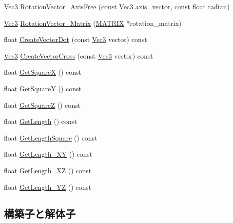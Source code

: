 \begin{DoxyCompactItemize}
\item 
\mbox{\hyperlink{_vector3_d_8h_ab16f59e4393f29a01ec8b9bbbabbe65d}{Vec3}} \mbox{\hyperlink{class_vector3_d_aadbe9f3e0ee3298c59cf123b592140bd}{Rotation\+Vector\+\_\+\+Axis\+Free}} (const \mbox{\hyperlink{_vector3_d_8h_ab16f59e4393f29a01ec8b9bbbabbe65d}{Vec3}} axis\+\_\+vector, const float radian)
\item 
\mbox{\hyperlink{_vector3_d_8h_ab16f59e4393f29a01ec8b9bbbabbe65d}{Vec3}} \mbox{\hyperlink{class_vector3_d_aa368719da4c1ac4e8a727edbd09ec390}{Rotation\+Vector\+\_\+\+Matrix}} (\mbox{\hyperlink{_vector3_d_8h_a032295cd9fb1b711757c90667278e744}{M\+A\+T\+R\+IX}} $\ast$rotation\+\_\+matrix)
\item 
float \mbox{\hyperlink{class_vector3_d_aed4c9936346cfbcb7238bd64ae1601d3}{Create\+Vector\+Dot}} (const \mbox{\hyperlink{_vector3_d_8h_ab16f59e4393f29a01ec8b9bbbabbe65d}{Vec3}} vector) const
\item 
\mbox{\hyperlink{_vector3_d_8h_ab16f59e4393f29a01ec8b9bbbabbe65d}{Vec3}} \mbox{\hyperlink{class_vector3_d_accbd42535a385947ac5380084f2c688c}{Create\+Vector\+Cross}} (const \mbox{\hyperlink{_vector3_d_8h_ab16f59e4393f29a01ec8b9bbbabbe65d}{Vec3}} vector) const
\item 
float \mbox{\hyperlink{class_vector3_d_a77ee5fc836fd4024bd8bdae603b1677e}{Get\+SquareX}} () const
\item 
float \mbox{\hyperlink{class_vector3_d_a151d4791ff98d3f99d038c1dc372e0fc}{Get\+SquareY}} () const
\item 
float \mbox{\hyperlink{class_vector3_d_a8ede9efe34b69e067153688aea96574f}{Get\+SquareZ}} () const
\item 
float \mbox{\hyperlink{class_vector3_d_a8b10872079076291bbbc81b7d48aa514}{Get\+Length}} () const
\item 
float \mbox{\hyperlink{class_vector3_d_a0d486a19d3f7515e2f147c78bb73ce07}{Get\+Length\+Square}} () const
\item 
float \mbox{\hyperlink{class_vector3_d_abaf2a0ccb78fdf2c3a393959e9c29708}{Get\+Length\+\_\+\+XY}} () const
\item 
float \mbox{\hyperlink{class_vector3_d_ae61982f6eb062257652f624ab1801089}{Get\+Length\+\_\+\+XZ}} () const
\item 
float \mbox{\hyperlink{class_vector3_d_a183854c5c7ea8bf32f752a02cf3fc3ce}{Get\+Length\+\_\+\+YZ}} () const
\end{DoxyCompactItemize}


\subsection{構築子と解体子}
\mbox{\label{class_vector3_d_a0b11a8d75da427b27443d8a94d0d296c}} 
